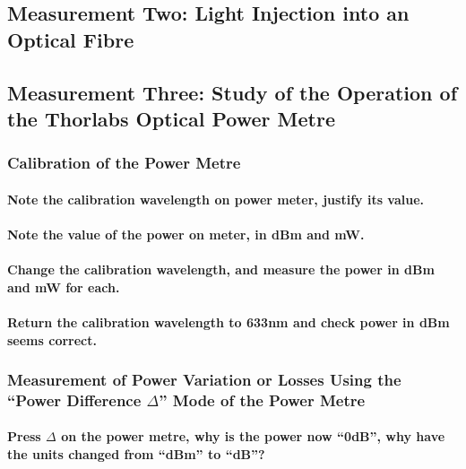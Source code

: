 \documentclass[colorlinks,11pt,a4paper,normalphoto,withhyper,ragged2e]{altareport}
\begin{document}
\subsection{Measurement Two: Light Injection into an Optical Fibre}



\subsection{Measurement Three: Study of the Operation of the Thorlabs Optical Power Metre}

\subsubsection{Calibration of the Power Metre}

\paragraph{Note the calibration wavelength on power meter, justify its value.}

\paragraph{Note the value of the power on meter, in dBm and mW.}

\paragraph{Change the calibration wavelength, and measure the power in dBm and mW for each.}

\paragraph{Return the calibration wavelength to 633nm and check power in dBm seems correct.}	


\subsubsection{Measurement of Power Variation or Losses Using the ``Power Difference $\Delta$'' Mode of the Power Metre}

\paragraph{Press $\Delta$ on the power metre, why is the power now ``0dB'', why have the units changed from ``dBm'' to ``dB''?}
\end{document}
